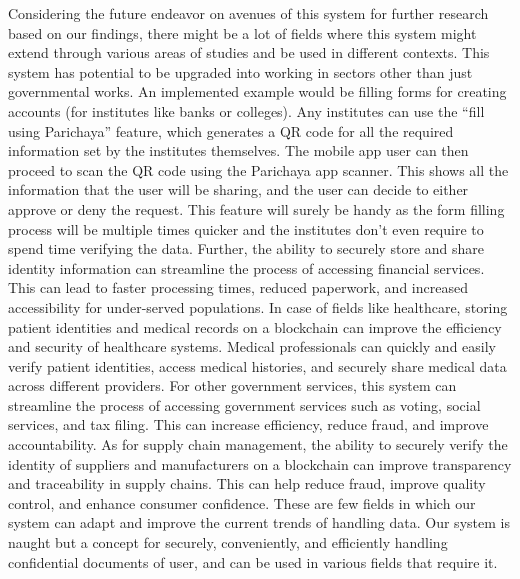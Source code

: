 Considering the future endeavor on avenues of this system for further research based on our findings, there might be a lot of fields where this system might extend through various areas of studies and be used in different contexts. This system has potential to be upgraded into working in sectors other than just governmental works. An implemented example would be filling forms for creating accounts (for institutes like banks or colleges). Any institutes can use the “fill using Parichaya” feature, which generates a QR code for all the required information set by the institutes themselves. The mobile app user can then proceed to  scan the QR code using the Parichaya app scanner. This shows all the information that the user will be sharing, and the user can decide to either approve or deny the request. This feature will surely be handy as the form filling process will be multiple times quicker and the institutes don’t even require to spend time verifying the data. 
Further, the ability to securely store and share identity information can streamline the process of accessing financial services. This can lead to faster processing times, reduced paperwork, and increased accessibility for under-served populations. In case of fields like healthcare, storing patient identities and medical records on a blockchain can improve the efficiency and security of healthcare systems. Medical professionals can quickly and easily verify patient identities, access medical histories, and securely share medical data across different providers. For other government services, this system can streamline the process of accessing government services such as voting, social services, and tax filing. This can increase efficiency, reduce fraud, and improve accountability. As for supply chain management, the ability to securely verify the identity of suppliers and manufacturers on a blockchain can improve transparency and traceability in supply chains. This can help reduce fraud, improve quality control, and enhance consumer confidence. These are few fields in which our system can adapt and improve the current trends of handling data. Our system is naught but a concept for securely, conveniently, and efficiently handling confidential documents of user, and can be used in various fields that require it.
